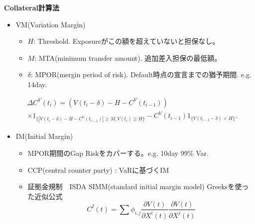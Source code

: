 \documentclass[driverfallback=dvipdfmx,cjk]{beamer}
\begin{document}
\begin{frame}
    \textbf{Collateral計算法}
    \begin{itemize}
        \item VM(Variation Margin)
            \begin{itemize}
                \item $H$: Threshold. Exposureがこの額を超えていないと担保なし。
                \item $M$: MTA(minimum transfer amount). 追加差入担保の最低額。
                \item $\delta$: MPOR(mergin period of risk). Default時点の宣言までの猶予期間. e.g. 14day.
            \end{itemize}
        \end{itemize}
    \begin{align*}
       &\Delta C^V(t_i) = (V(t_i-\delta)-H-C^V(t_{i-1}))\\
       &\times 1_{\{|V(t_i-\delta)-H-C^V(t_{i-1})| \ge M, V(t_i)\ge H\}}
       -C^V(t_{i-1})1_{\{V(t_{i-1}-\delta)<H\}}.
   \end{align*}
    \begin{itemize}
        \item IM(Initial Margin)
            \begin{itemize}
                \item MPOR期間のGap Riskをカバーする。e.g. 10day 99\% Var.
                \item CCP(central counter party) : VaRに基づくIM
                \item 証拠金規制　ISDA SIMM(standard initial margin model)
                    Greeksを使った近似公式
                    $$C^I(t) = \sum \phi_{i,j} \frac{\partial V(t)}{\partial X^i(t)} \frac{\partial V(t)}{\partial X^j(t)}$$
            \end{itemize}
    \end{itemize}
\end{frame}
\end{document}
